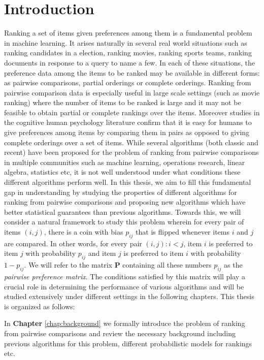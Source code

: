 \documentclass[12pt, twoside]{iiscthes}
\newcommand{\bP}{{\mathbf{P}}}
\begin{document}
\chapter{Introduction}
\label{chap:intro}
Ranking a set of items given preferences among them is a fundamental problem in machine learning. It arises naturally in several real world situations such as ranking candidates in a election, ranking movies, ranking sports teams, ranking documents in response to a query to name a few. In each of these situations, the preference data among the items to be ranked may be available in different forms: as pairwise comparisons, partial orderings or complete orderings.  Ranking from pairwise comparison data is especially useful in large scale settings (such as movie ranking) where the number of items to be ranked is large and it may not be feasible to obtain partial or complete rankings over the items. Moreover studies in the cognitive human psychology literature confirm that it is easy for humans to give preferences among items by comparing them in pairs as opposed to giving complete orderings over a set of items. 
While several algorithms (both classic and recent) have been proposed for the problem of ranking from pairwise comparisons in multiple communities such as machine learning, operations research, linear algebra, statistics etc, it is not well understood under what conditions these different algorithms perform well. In this thesis, we aim to fill this fundamental gap in understanding by studying the properties of different algorithms for ranking from pairwise comparisons and proposing new algorithms which have better statistical guarantees than previous algorithms. Towards this, we will consider a natural framework to study this problem wherein for every pair of items $(i,j)$, there is a coin with bias $p_{ij}$ that is flipped whenever items $i$ and $j$ are compared. In other words, for every pair $(i,j): i < j$, item $i$ is preferred to item $j$ with probability $p_{ij}$ and item $j$ is preferred to item $i$ with probability $1 - p_{ij}$. We will refer to the matrix $\bP$ containing all these numbers $p_{ij}$ as the \emph{pairwise preference matrix}. The conditions satisfied by this matrix will play a crucial role in determining the performance of various algorithms and will be studied extensively under different settings in the following chapters.  This thesis is organized as follows:

In \textbf{Chapter} \ref{chap:background}  we formally introduce the problem of ranking from pairwise comparisons and review the necessary background  including previous algorithms for this problem, different probabilistic models for rankings etc. 
 
\end{document}
